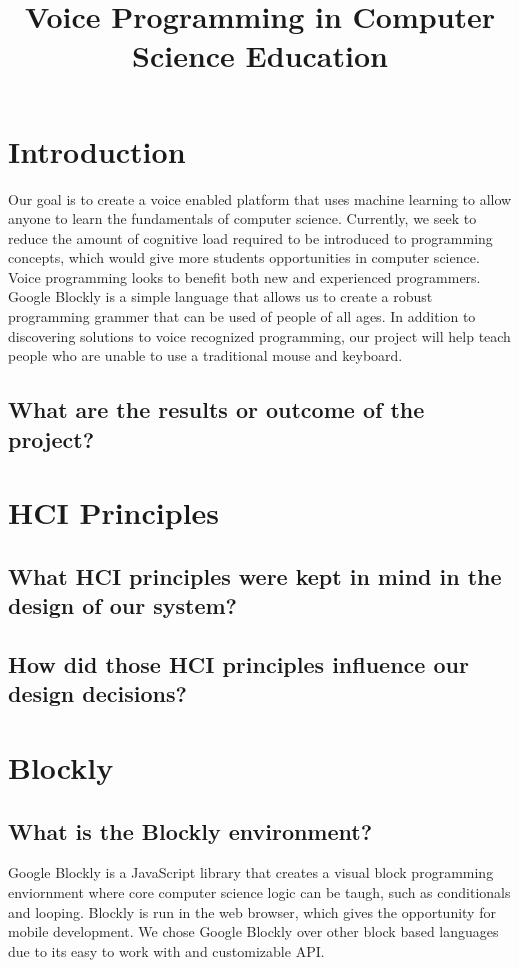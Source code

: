 \documentclass[]{article}
\title{Voice Programming in Computer Science Education}
\begin{document}
\maketitle

\section{Introduction}

Our goal is to create a voice enabled platform that uses machine learning to allow 
anyone to learn the fundamentals of computer science. Currently, we seek to reduce the amount
of cognitive load required to be introduced to programming concepts, which would give more 
students opportunities in computer science. 
\\ 
Voice programming looks to benefit both new and experienced programmers.  
Google Blockly is a simple language that allows us to create a robust programming grammer 
that can be used of people of all ages. In addition to discovering solutions to voice 
recognized programming, our project will help teach people who are unable to use a traditional mouse and keyboard.

\subsection{What are the results or outcome of the project?}

\section{HCI Principles}

\subsection{What HCI principles were kept in mind in the design of our system?}

\subsection{How did those HCI principles influence our design decisions?}

\section{Blockly}

\subsection{What is the Blockly environment?}
Google Blockly is a JavaScript library that creates a visual block programming 
enviornment where core computer science logic can be taugh, such as conditionals and 
looping. Blockly is run in the web browser, which gives the opportunity for mobile development. We chose Google Blockly over other block based languages due to its easy to
work with and customizable API.
\end{document}
